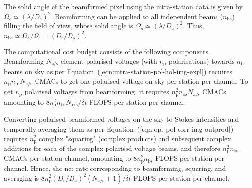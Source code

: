 \documentclass[
  journal=pasa,
  manuscript=article-type,
  year=2020,
  volume=37,
]{cup-journal}
\begin{document}
The solid angle of the beamformed pixel using the intra-station data is given by $\Omega_s \simeq (\lambda/D_\textrm{s})^2$. Beamforming can be applied to all independent beams ($n_\textrm{bs}$) filling the field of view, whose solid angle is $\Omega_a \simeq (\lambda/D_\textrm{a})^2$. Thus, $n_\textrm{bs} \simeq \Omega_\textrm{a}/\Omega_\textrm{s}=(D_\textrm{s}/D_\textrm{a})^2$. 

The computational cost budget consists of the following components. Beamforming $N_\textrm{a/s}$ element polarised voltages (with $n_\textrm{p}$ polarisations) towards $n_\textrm{bs}$ beams on sky as per Equation~(\ref{eqn:intra-station-pol-hol-img-expl}) requires $n_\textrm{p} n_\textrm{bs} N_\textrm{a/s}$ CMACs to get one polarised voltage on sky per station per channel. To get $n_\textrm{p}$ polarised voltages from beamforming, it requires $n_\textrm{p}^2 n_\textrm{bs} N_\textrm{a/s}$ CMACs amounting to $8 n_\textrm{p}^2 n_\textrm{bs} N_\textrm{a/s}/\delta t$ FLOPS per station per channel. 

Converting polarised beamformed voltages on the sky to Stokes intensities and temporally averaging them as per Equation~(\ref{eqn:opt-pol-corr-img-outprod}) requires $n_\textrm{p}^2$ complex "squaring" (complex products) and subsequent complex additions for each of the complex polarised voltage beams, and therefore $n_\textrm{p}^2 n_\textrm{bs}$ CMACs per station channel, amounting to $8 n_\textrm{p}^2 n_\textrm{bs}$ FLOPS per station per channel. Hence, the net rate corresponding to beamforming, squaring, and averaging is $8 n_\textrm{p}^2 (D_\textrm{s}/D_\textrm{a})^2 (N_\textrm{a/s}+1)/\delta t$ FLOPS per station per channel. 

\end{document}
